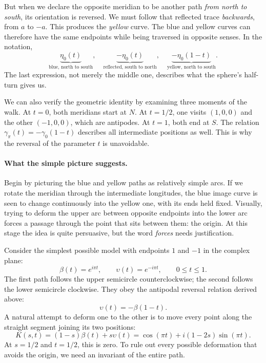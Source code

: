 But when we declare the opposite meridian to be another path \emph{from north to south}, its orientation is reversed. We must follow that reflected trace \emph{backwards}, from \(a\) to \(-a\). This produces the \emph{yellow} curve. The blue and yellow curves can therefore have the same endpoints while being traversed in opposite senses. In the notation,
\[
 \underbrace{\eta_0(t)}_{\text{blue, north to south}},
 \quad
 \underbrace{-\eta_0(t)}_{\text{reflected, south to north}},
 \quad
 \underbrace{-\eta_0(1-t)}_{\text{yellow, north to south}}.
\]
The last expression, not merely the middle one, describes what the sphere's half-turn gives us.

We can also verify the geometric identity by examining three moments of the walk. At \(t=0\), both meridians start at \(N\). At \(t=1/2\), one visits \((1,0,0)\) and the other \((-1,0,0)\), which are antipodes. At \(t=1\), both end at \(S\). The relation \(\gamma_\pi(t)=-\gamma_0(1-t)\) describes all intermediate positions as well. This is why the reversal of the parameter \(t\) is unavoidable.

\paragraph{What the simple picture suggests.}
Begin by picturing the blue and yellow paths as relatively simple arcs. If we rotate the meridian through the intermediate longitudes, the blue image curve is seen to change continuously into the yellow one, with its ends held fixed. Visually, trying to deform the upper arc between opposite endpoints into the lower arc forces a passage through the point that sits between them: the origin. At this stage the idea is quite persuasive, but the word \emph{forces} needs justification.

Consider the simplest possible model with endpoints \(1\) and \(-1\) in the complex plane:
\[
 \beta(t)=e^{i\pi t},\qquad
 \upsilon(t)=e^{-i\pi t},\qquad 0\leq t\leq1.
\]
The first path follows the upper semicircle counterclockwise; the second follows the lower semicircle clockwise. They obey the antipodal reversal relation derived above:
\[
 \upsilon(t)=-\beta(1-t).
\]
A natural attempt to deform one to the other is to move every point along the straight segment joining its two positions:
\[
 K(s,t)=(1-s)\beta(t)+s\upsilon(t)
       =\cos(\pi t)+i(1-2s)\sin(\pi t).
\]
At \(s=1/2\) and \(t=1/2\), this is zero. To rule out every possible deformation that avoids the origin, we need an invariant of the entire path.

